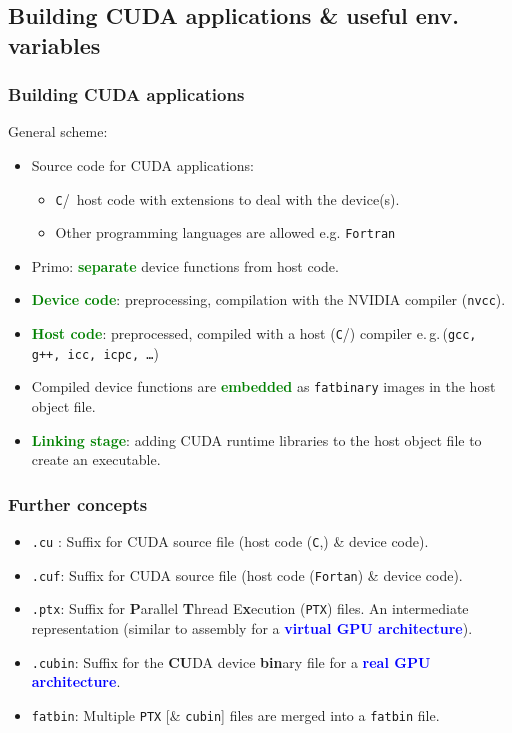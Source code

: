 \subsection{Building CUDA applications \& useful env. variables} 
\begin{frame}
   \frametitle{Building CUDA applications}
      General scheme:
      \begin{itemize}
         \item Source code for CUDA applications:
            \begin{itemize}		 
	       \item \texttt{C}/\CC\ host code with extensions to deal with the device(s). 
	       \item Other programming languages are allowed e.g. \texttt{Fortran} 
            \end{itemize}	
         \item Primo: \textbf{\textcolor{green}{separate}} device functions from host code.
         \item \textbf{\textcolor{green}{Device code}}: preprocessing, compilation 
	       with the NVIDIA compiler (\texttt{nvcc}).		 
         \item \textbf{\textcolor{green}{Host code}}: preprocessed, compiled with a host (\texttt{C}/\CC) 
	       compiler e.\,g.\,(\texttt{gcc, g++, icc, icpc, \ldots})
	 \item Compiled device functions are \textbf{\textcolor{green}{embedded}} as \texttt{fatbinary} 
	       images in the host object file.
         \item \textbf{\textcolor{green}{Linking stage}}: adding CUDA runtime libraries 
	       to the host object file to create an executable.
      \end{itemize}		      
\end{frame}


\begin{frame}
   \frametitle{Further concepts}
      \begin{itemize}
	 \item \texttt{.cu} : Suffix for CUDA source file (host code (\texttt{C},\CC) \& device code).
	 \item \texttt{.cuf}: Suffix for CUDA source file (host code (\texttt{Fortan}) \& device code).
	 \item \texttt{.ptx}: Suffix for \textbf{P}arallel \textbf{T}hread E\textbf{x}ecution (\texttt{PTX}) files. 
		 An intermediate representation (similar to assembly for a 
		 \textbf{\textcolor{blue}{virtual GPU architecture}}).
		       
	 \item \texttt{.cubin}: Suffix for the \textbf{CU}DA device \textbf{bin}ary 
		 file for a \textbf{\textcolor{blue}{real GPU architecture}}.
	 \item \texttt{fatbin}: Multiple \texttt{PTX} [\& \texttt{cubin}] files are merged into a \texttt{fatbin} file.
      \end{itemize}
\end{frame}	



